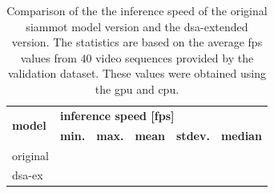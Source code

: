 \begin{table}[!t]
    \centering
    \begin{tabular}{llllll}
        \toprule
        \multirow{2}{*}{\textbf{model}} & \multicolumn{5}{l}{\textbf{inference speed [\gls{fps}]}}                                                                     \\
                                        & \textbf{min.}                                            & \textbf{max.} & \textbf{mean} & \textbf{stdev.} & \textbf{median} \\
        \midrule
        original                        &                                                          &               &               &                 &                 \\
        \gls{dsa}-ex                    &                                                          &               &               &                 &                 \\
        \bottomrule
    \end{tabular}
    \caption[\gls{dsa} extension inference time comparison]{Comparison of the the inference speed of the original \gls{siammot} model version and the \gls{dsa}-extended version. The statistics are based on the average \gls{fps} values from $40$ video sequences provided by the \uadetrac{} validation dataset. These values were obtained using the \usedgpu{} \gls{gpu} and \usedcpu{} \gls{cpu}.}
    \label{tab:InferenceSpeedComparison}
\end{table}